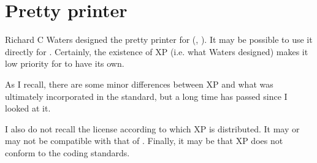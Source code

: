 \chapter{Pretty printer}

Richard C Waters designed the pretty printer for
\cl{} (\cite{Waters89xp:a}, \cite{Waters:1992:UNC:1039991.1039996}).
It may be possible to use it directly for \sysname{}.  Certainly, the
existence of XP (i.e. what Waters designed) makes it low priority for
\sysname{} to have its own. 

As I recall, there are some minor differences between XP and what was
ultimately incorporated in the standard, but a long time has passed
since I looked at it.

I also do not recall the license according to which XP is distributed.
It may or may not be compatible with that of \sysname{}.  Finally, it
may be that XP does not conform to the \sysname{} coding standards.



